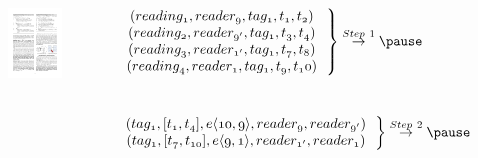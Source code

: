 \begin{frame}
\begin{columns}[c]
\vspace{-15pt}
\begin{figure}[tb]
  \includegraphics[width=\columnwidth]{figures/2-1/2-1-12.pdf}
\end{figure}
\tiny{
  $\left.\begin{matrix}
  \mathnormal{(reading_1, reader_{9}, tag_1, t_1, t_2)}~~\\
  \mathnormal{(reading_2, reader_{9'}, tag_1, t_3, t_4)}~~\\
  \mathnormal{(reading_3, reader_{1'}, tag_1, t_7, t_8)}~~\\
  \mathnormal{(reading_4, reader_{1}, tag_1, t_9, t_10)}~~
  \end{matrix}\right\} \overset{Step~1}{\rightarrow} \pause$ \\~\\~\\

  $\left.\begin{matrix}
  \mathnormal{(tag_1, [t_1,t_4], e\langle 10,9 \rangle, reader_{9}, reader_{9'})}~~\\
  \mathnormal{(tag_1, [t_7,t_{10}], e\langle 9,1 \rangle, reader_{1'}, reader_{1})}~~
  \end{matrix}\right\} \overset{Step~2}{\rightarrow} \pause$ \\~\\~\\

}
\end{columns}
\end{frame}
